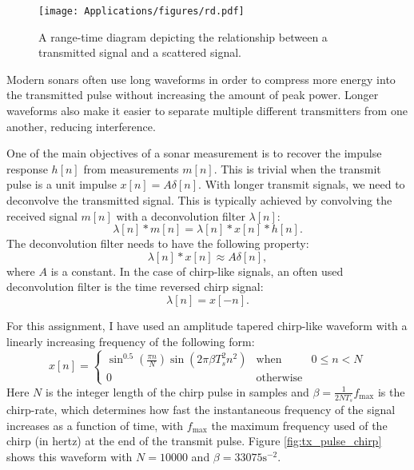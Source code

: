 \begin{figure}
\begin{center}
\texttt{[image: Applications/figures/rd.pdf]}
\end{center}
\caption{A range-time diagram depicting the relationship between a transmitted signal and a scattered signal.}
\label{fig:range_time_diagram_ex}
\end{figure}

Modern sonars often use long waveforms in order to compress more
energy into the transmitted pulse without increasing the amount of
peak power. Longer waveforms also make it easier to separate multiple
different transmitters from one another, reducing interference. 

One of the main objectives of a sonar measurement is to recover the impulse
response $h[n]$ from measurements $m[n]$. This is trivial when the
transmit pulse is a unit impulse $x[n]=A\delta[n]$. With longer
transmit signals, we need to deconvolve the transmitted signal. This
is typically achieved by convolving the received signal $m[n]$ with a 
deconvolution filter $\lambda[n]$:
\begin{equation}
  \lambda[n]*m[n] = \lambda[n] * x[n] * h[n].
\end{equation}
The deconvolution filter needs to have the following property:
\begin{equation}
  \lambda[n]*x[n] \approx A\delta[n],
\end{equation}
where $A$ is a constant. In the case of chirp-like signals, an often used 
deconvolution filter is the time reversed chirp signal:
\begin{equation}
  \lambda[n] = x[-n].
\end{equation}

For this assignment, I have used an amplitude tapered chirp-like
waveform with a linearly increasing frequency of the following form:
\begin{equation}
  x[n] = \left\{
\begin{array}{ccc}
  \sin^{0.5}\left(\frac{\pi n}{N}\right) \sin(2\pi \beta T_s^2 n^2) & \mathrm{when} & 0 \le n < N\\
  0 & \mathrm{otherwise} & 
  \end{array}\right.
\end{equation}
Here $N$ is the integer length of the chirp pulse in samples and
$\beta = \frac{1}{2 N T_s}f_{\mathrm{max}}$ is the chirp-rate, which
determines how fast the instantaneous frequency of the signal
increases as a function of time, with $f_{\mathrm{max}}$ the maximum
frequency used of the chirp (in hertz) at the end of the transmit
pulse. Figure \ref{fig:tx_pulse_chirp} shows this waveform with
$N=10000$ and $\beta = 33075 \text{s}^{-2}$.

